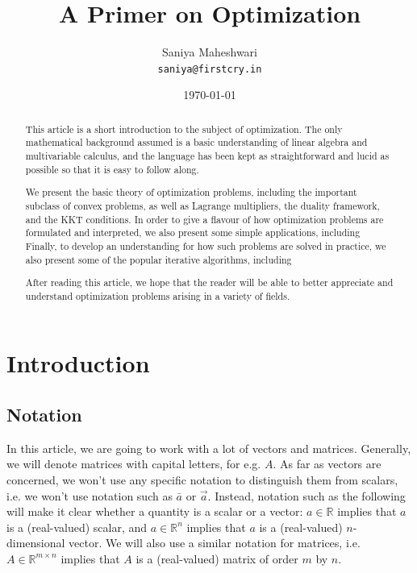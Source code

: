 \documentclass[a4paper]{article}
\theoremstyle{definition}
\begin{document}
\title{A Primer on Optimization}
\author{Saniya Maheshwari \\ \texttt{saniya@firstcry.in}}
\date{\today}
\maketitle

\begin{abstract}
	This article is a short introduction to the subject of optimization.
	The only mathematical background assumed is a basic understanding of linear algebra and multivariable calculus, and the language has been kept as straightforward and lucid as possible so that it is easy to follow along.

	We present the basic theory of optimization problems, including the important subclass of convex problems, as well as Lagrange multipliers, the duality framework, and the KKT conditions.
	In order to give a flavour of how optimization problems are formulated and interpreted, we also present some simple applications, including %
	Finally, to develop an understanding for how such problems are solved in practice, we also present some of the popular iterative algorithms, including %

	After reading this article, we hope that the reader will be able to better appreciate and understand optimization problems arising in a variety of fields.
\end{abstract}

\section{Introduction}

\subsection{Notation}

In this article, we are going to work with a lot of vectors and matrices.
Generally, we will denote matrices with capital letters, for e.g. $A$.
As far as vectors are concerned, we won't use any specific notation to distinguish them from scalars, i.e. we won't use notation such as $\bar{a}$ or $\vec{a}$.
Instead, notation such as the following will make it clear whether a quantity is a scalar or a vector: $a \in \mathbb{R}$ implies that $a$ is a (real-valued) scalar, and $a \in \mathbb{R}^n$ implies that $a$ is a (real-valued) $n$-dimensional vector.
We will also use a similar notation for matrices, i.e. $A \in \mathbb{R}^{m \times n}$ implies that $A$ is a (real-valued) matrix of order $m$ by $n$.
\end{document}
